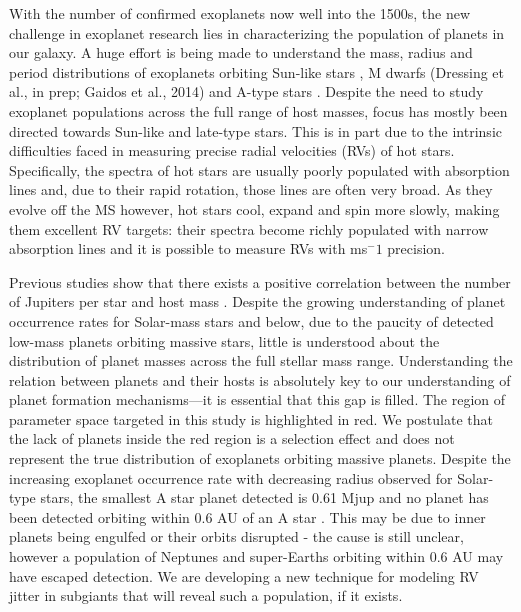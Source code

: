 \documentclass[useAMS, usenatbib]{aastex}
\begin{document}

With the number of confirmed exoplanets now well into the 1500s, the new
challenge in exoplanet research lies in characterizing the population of
planets in our galaxy.
A huge effort is being made to understand the mass, radius and period
distributions of exoplanets orbiting Sun-like stars
\citep[e.g.][]{Butler2006, Howard2010, Petigura2013, Foreman-Mackey2014},
M dwarfs (Dressing et al., in prep; Gaidos et al., 2014) and A-type stars
\citep{Johnson2010a}.
Despite the need to study exoplanet populations across the full range of host
masses, focus has mostly been directed towards Sun-like and late-type stars.
This is in part due to the intrinsic difficulties faced in measuring precise
radial velocities (RVs) of hot stars.
Specifically, the spectra of hot stars are usually poorly populated with
absorption lines and, due to their rapid rotation, those lines are often very
broad.
As they evolve off the MS however, hot stars cool, expand and spin more
slowly, making them excellent RV targets: their spectra become richly
populated with narrow absorption lines and it is possible to measure RVs with
ms$^-1$ precision.

Previous studies show that there exists a positive correlation between the
number of Jupiters per star and host mass \citep{Johnson2010a, Bowler2010,
Lovis2007}.
Despite the growing understanding of planet occurrence rates for Solar-mass
stars and below, due to the paucity of
detected low-mass planets orbiting massive stars, little is understood about
the distribution of planet masses across the full stellar mass range.
Understanding the relation between planets and their hosts is absolutely key
to our understanding of planet formation mechanisms---it is essential that
this gap is filled.
The region of parameter space targeted in this study is highlighted in red.
We postulate that the lack of planets inside the red region is a selection
effect and does not represent the true distribution of exoplanets orbiting
massive planets.
Despite the increasing exoplanet occurrence rate with decreasing radius
observed for Solar-type stars, the smallest A star planet detected is 0.61 Mjup
and no planet has been detected orbiting within 0.6 AU of an A star
\citep{Johnson2007}.
This may be due to inner planets being engulfed or their orbits
disrupted - the cause is still unclear, however a population of Neptunes and
super-Earths orbiting within 0.6 AU may have escaped detection.
We are developing a new technique for modeling RV jitter in subgiants that will
reveal such a population, if it exists.
\end{document}
